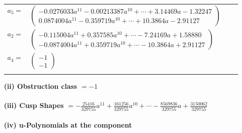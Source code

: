 \documentclass[1p]{elsarticle_modified}
\theoremstyle{definition}
\begin{document}
\begin{tabular}{m{7pt} m{180pt} m{7pt} m{180pt} }
\flushright $a_{5}=$&$\begin{pmatrix}-0.0276033 a^{11}-0.00213387 a^{10}+\cdots+3.14469 a-1.32247\\0.0874004 a^{11}-0.359719 a^{10}+\cdots+10.3864 a-2.91127\end{pmatrix}$ \\
\flushright $a_{2}=$&$\begin{pmatrix}-0.115004 a^{11}+0.357585 a^{10}+\cdots-7.24169 a+1.58880\\-0.0874004 a^{11}+0.359719 a^{10}+\cdots-10.3864 a+2.91127\end{pmatrix}$ \\
\flushright $a_{4}=$&$\begin{pmatrix}-1\\-1\end{pmatrix}$\\&\end{tabular}
\flushleft \textbf{(ii) Obstruction class $= -1$}\\~\\
\flushleft \textbf{(iii) Cusp Shapes $= -\frac{25416}{329755} a^{11}+\frac{161256}{329755} a^{10}+\cdots-\frac{8569836}{329755} a+\frac{3150062}{329755}$}\\~\\
\newpage\renewcommand{\arraystretch}{1}
\flushleft \textbf{(iv) u-Polynomials at the component}\newline \\
\end{document}
